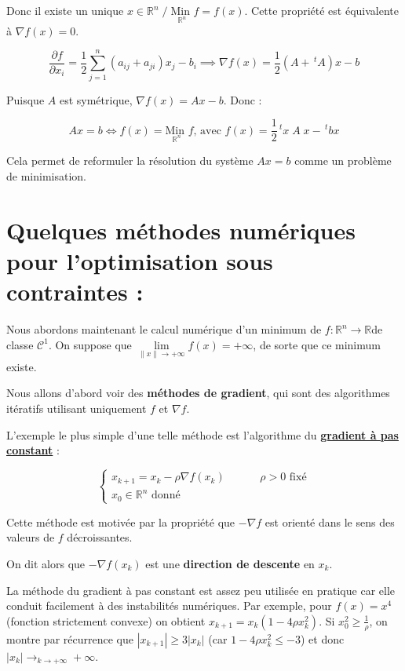 \documentclass[a4paper,11pt]{article}
\newcommand{\R}{\mathbb{R}}
\newcommand{\norm}[1]{\left\lVert#1\right\rVert}
\newcommand{\tpo}[1]{\,^t#1}
\newcommand{\derpart}[2]{\displaystyle\frac{\partial#1}{\partial #2}}
\newcommand{\deffonc}[3]{#1 : #2 \longrightarrow #3}
\newcommand{\Co}{\mathcal{C}}
\newcommand{\MinI}[1]{\underset{#1}{\text{Min }}}
\theoremstyle{plain} %
\begin{document}
Donc il existe un unique $x \in \R^n \; / \; \MinI{\R^n} f = f(x)$.
Cette propriété est équivalente à $\nabla f(x) = 0$. 

\[
    \derpart{f}{x_i} = \frac{1}{2} \sum_{j=1}^n (a_{ij} + a_{ji})x_j - b_i
    \implies \nabla f(x) = \frac{1}{2}(A + \tpo{A})x - b
\]

Puisque $A$ est symétrique, $\nabla f(x) = Ax - b$. Donc :

\[
    Ax = b \iff f(x) = \MinI{\R^n} f \text{, avec } f(x) = \frac{1}{2}\tpo{x} \; A \; x - \tpo{b} x
\]

Cela permet de reformuler la résolution du système $Ax = b$ comme un problème
de minimisation.

\section{Quelques méthodes numériques pour l'optimisation sous contraintes :}

Nous abordons maintenant le calcul numérique d'un minimum de $\deffonc{f}{\R^n}{\R}$de classe $\Co^1$. On suppose que $\underset{\norm{x} \longrightarrow +\infty}{\lim} f(x) = +\infty$, de sorte que ce minimum existe.

Nous allons d'abord voir des \textbf{méthodes de gradient}, qui sont des
algorithmes itératifs utilisant uniquement $f$ et $\nabla f$.

L'exemple le plus simple d'une telle méthode est l'algorithme du
\underline{\textbf{gradient à pas constant}} :

\[
    \left\lbrace
    \begin{array}{cc}
        x_{k+1} = x_k - \rho \nabla f(x_k) & \hspace{1cm} \rho > 0 \text{ fixé} \\ [5pt]
        x_0 \in \R^n \text{ donné}
    \end{array}
    \right.
\]


Cette méthode est motivée par la propriété que $-\nabla f$ est orienté dans
le sens des valeurs de $f$ décroissantes.

On dit alors que $- \nabla f(x_k)$ est une \textbf{direction de descente} en $x_k$.

La méthode du gradient à pas constant est assez peu utilisée en pratique
car elle conduit facilement à des instabilités numériques. Par exemple,
pour $f(x) = x^4$ (fonction strictement convexe) on obtient $x_{k+1} = x_k(1-4 \rho x_k^2)$. Si $x_0^2 \geq \frac{1}{\rho}$, on montre par récurrence que
$|x_{k+1}| \geq 3 |x_k|$ (car $1-4\rho x_k^2 \leq - 3$) et donc $|x_k| \longrightarrow_{k\to +\infty} + \infty$.
\end{document}
